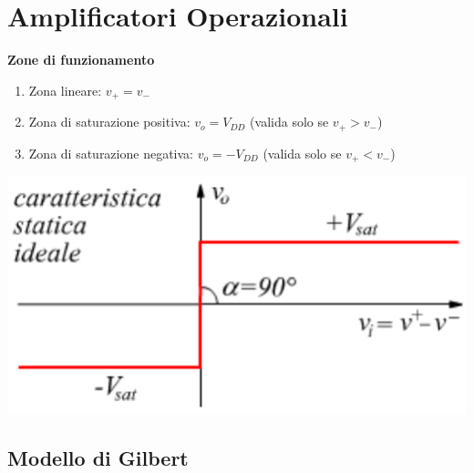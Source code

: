\documentclass{article}
\begin{document}
\section{Amplificatori Operazionali}
\textbf{Zone di funzionamento}
\begin{enumerate}
    \item Zona lineare: $v_{+}=v_{-}$
    \item Zona di saturazione positiva: $v_{o}=V_{DD}$ (valida solo se $v_{+}>v_{-}$)
    \item Zona di saturazione negativa: $v_{o}=-V_{DD}$ (valida solo se $v_{+}<v_{-}$)
    \end{enumerate}
\begin{center}
    \includegraphics[scale=0.7]{Opamp.png}
\end{center}
\subsection{Modello di Gilbert}
\end{document}
